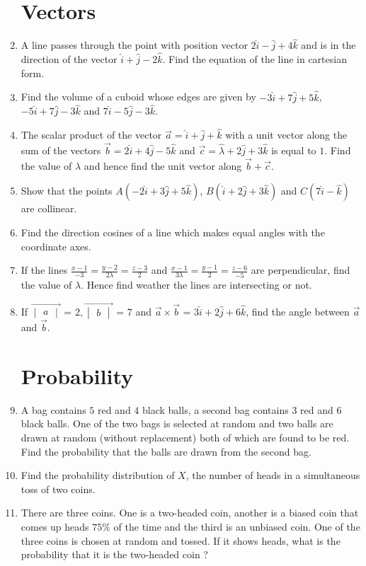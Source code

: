 \documentclass[2pt,-letter paper]{article}
\providecommand{\brak}[1]{\ensuremath{\left(#1\right)}}
\newcommand{\mydet}[1]{\ensuremath{\begin{vmatrix}#1\end{vmatrix}}}
\begin{document}
\begin{enumerate}
\section{Vectors}
\item A line passes through the point with position vector $2\hat{i}-\hat{j}+4\hat{k}$ and is in the direction of the vector $\hat{i}+\hat{j}-2\hat{k}$. Find the equation of the line in cartesian form.
\item Find the volume of a cuboid whose edges are given by $-3\hat{i}+7\hat{j}+5\hat{k}$,$-5\hat{i}+7\hat{j}-3\hat{k}$ and $7\hat{i}-5\hat{j}-3\hat{k}$.
\item The scalar product of the vector $\overrightarrow{a} = \hat{i}+\hat{j}+\hat{k}$ with a unit vector along the sum of the vectors $\overrightarrow{b} = 2\hat{i}+4\hat{j}-5\hat{k}$ and $\overrightarrow{c} = \hat{\lambda}+2\hat{j}+3\hat{k}$ is equal to $1$. Find the value of $\lambda$ and hence find the unit vector along $\overrightarrow{b}+\overrightarrow{c}$.
\item Show that the points $A\brak{-2\hat{i}+3\hat{j}+5\hat{k}}$, $B\brak{\hat{i}+2\hat{j}+3\hat{k}}$ and $C\brak{7\hat{i}-\hat{k}}$ are collinear.
\item Find the direction cosines of a line which makes equal angles with the coordinate axes.
\item If the lines $\frac{x-1}{-3}=\frac{y-2}{2\lambda}=\frac{z-3}{2}$ and $\frac{x-1}{3\lambda}=\frac{y-1}{2}=\frac{z-6}{-5}$ are perpendicular, find the value of $\lambda$. Hence find weather the lines are intersecting or not.
\item If ${\overrightarrow{\mydet{a}}}$ = $2, {\overrightarrow{\mydet{b}}}$ = $7$ and $\overrightarrow{a}\times\overrightarrow{b}$ = $3\hat{i}+2\hat{j}+6\hat{k}$, find the angle between $\overrightarrow{a}$ and $\overrightarrow{b}$.
\section{Probability}
\item A bag contains $5$ red and $4$ black balls, a second bag contains $3$ red and $6$ black balls. One of the two bags is selected at random and two balls are drawn at random (without replacement) both of which are found to be red. Find the probability that the balls are drawn from the second bag.
\item Find the probability distribution of $X$, the number of heads in a simultaneous toss of two coins.
\item There are three coins. One is a two-headed coin, another is a biased coin that comes up heads $75\%$ of the time and the third is an unbiased coin. One of the three coins is chosen at random and tossed. If it shows heads, what is the probability that it is the two-headed coin ?

\end{enumerate}
\end{document}
